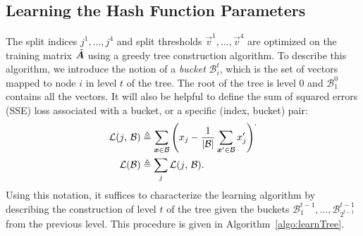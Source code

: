 \vspace{-2mm}
\subsection{Learning the Hash Function Parameters}

The split indices ${j^1,\ldots,j^4}$ and split thresholds $\vec{v}^1,\ldots,\vec{v}^4$ are optimized on the training matrix $\tilde{\bm{A}}$ using a greedy tree construction algorithm.
To describe this algorithm, we introduce the notion of a \textit{bucket} $\mathcal{B}^t_i$, which is the set of vectors mapped to node $i$ in level $t$ of the tree. The root of the tree is level 0 and $\mathcal{B}^0_1$ contains all the vectors. It will also be helpful to define the sum of squared errors (SSE) loss associated with a bucket, or a specific (index, bucket) pair:
\begin{align}
    \mathcal{L}(j \text{, } \mathcal{B}) &\triangleq \sum_{\bm{x} \in \mathcal{B}} \left( x_j - \frac{1}{|\mathcal{B}|}\sum_{\bm{x}^\prime \in \mathcal{B}} x^\prime_j \right)^.  \\
    \mathcal{L}(\mathcal{B}) &\triangleq \sum_j \mathcal{L}(j \text{, } \mathcal{B}).
\end{align}
Using this notation, it suffices to characterize the learning algorithm by describing the construction of level $t$ of the tree given the buckets $\mathcal{B}^{t-1}_1,\ldots,\mathcal{B}^{t-1}_{2^{t-1}}$ from the previous level. This procedure is given in Algorithm~\ref{algo:learnTree}.

